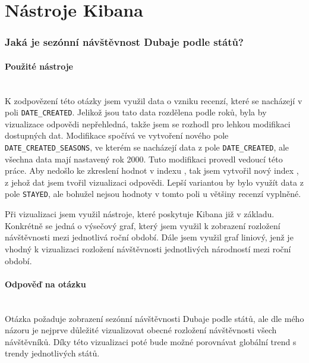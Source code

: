 \documentclass[czech,BP]{thesiskiv}
\begin{document}
\section{Nástroje Kibana}
\subsubsection{Jaká je sezónní návštěvnost Dubaje podle států?}
\label{subsub:Návštěvnost}
\paragraph{Použité nástroje}
\mbox{}\\
K zodpovězení této otázky jsem využil data o vzniku recenzí, které se nacházejí v poli \texttt{DATE\_CREATED}. Jelikož jsou tato data rozdělena podle roků, byla by vizualizace odpovědi nepřehledná, takže jsem se rozhodl pro lehkou modifikaci dostupných dat. Modifikace spočívá ve vytvoření nového pole \texttt{DATE\_CREATED\_SEASONS}, ve kterém se nacházejí data z pole \texttt{DATE\_CREATED}, ale všechna data mají nastavený rok 2000. Tuto modifikaci provedl vedoucí této práce. Aby nedošlo ke zkreslení hodnot v indexu , tak jsem vytvořil nový index , z jehož dat jsem tvořil vizualizaci odpovědi. Lepší variantou by bylo využít data z pole \texttt{STAYED}, ale bohužel nejsou hodnoty v tomto poli u většiny recenzí vyplněné. 


Při vizualizaci jsem využil nástroje, které poskytuje Kibana již v základu. Konkrétně se jedná o výsečový graf, který jsem využil k zobrazení rozložení návštěvnosti mezi jednotlivá roční období. Dále jsem využil graf liniový, jenž je vhodný k vizualizaci rozložení návštěvnosti jednotlivých národností mezi roční období.

\paragraph{Odpověď na otázku}
\mbox{}\\
Otázka požaduje zobrazení sezónní návštěvnosti Dubaje podle států, ale dle mého názoru je nejprve důležité vizualizovat obecné rozložení návštěvnosti všech návštěvníků. Díky této vizualizaci poté bude možné porovnávat globální trend s trendy jednotlivých států.
\end{document}
